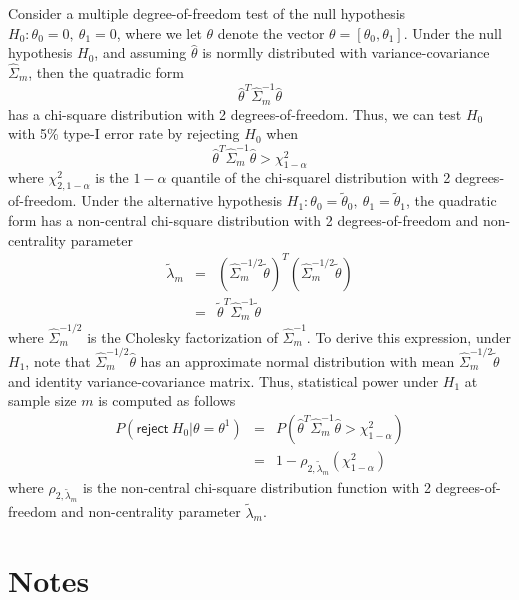 \documentclass{article}
\begin{document}
Consider a multiple degree-of-freedom test of the null hypothesis $H_0: \theta_0 = 0,\ \theta_1 = 0$, where we let $\theta$ denote the vector $\theta = [\theta_0, \theta_1]$. Under the null hypothesis $H_0$, and assuming $\hat{\theta}$ is normlly distributed with variance-covariance $\hat{\Sigma}_m$,  then the quatradic form
$$
\hat{\theta}^T\hat{\Sigma}_m^{-1}\hat{\theta}
$$
 has a chi-square distribution with 2 degrees-of-freedom. Thus, we can test $H_0$ with 5\% type-I error rate by rejecting $H_0$ when 
$$
\hat{\theta}^T\hat{\Sigma}_m^{-1}\hat{\theta} > \chi^2_{1-\alpha}
$$
where $\chi^2_{2,1-\alpha}$ is the $1-\alpha$ quantile of the chi-squarel distribution with 2 degrees-of-freedom. Under the alternative hypothesis $H_1: \theta_0 = \tilde{\theta}_0,\ \theta_1 = \tilde{\theta}_1$, the quadratic form has a non-central chi-square distribution with 2 degrees-of-freedom and non-centrality parameter
\begin{eqnarray}
\tilde{\lambda}_m &=& (\hat{\Sigma}_m^{-1/2}\tilde{\theta})^T(\hat{\Sigma}_m^{-1/2}\tilde{\theta}) \nonumber \\
&=& \tilde{\theta}^T\hat{\Sigma}_m^{-1} \tilde{\theta} \nonumber
\end{eqnarray}
where $\hat{\Sigma}_m^{-1/2}$ is the Cholesky factorization of $\hat{\Sigma}_m^{-1}$. To derive this expression, under $H_1$, note that $\hat{\Sigma}_m^{-1/2}\hat{\theta}$ has an approximate normal distribution with mean $\hat{\Sigma}_m^{-1/2}\tilde{\theta}$ and identity variance-covariance matrix. Thus, statistical power under $H_1$ at sample size $m$ is computed as follows
\begin{eqnarray}
P(\mathsf{reject}\ H_0 | \theta = \theta^1) &=& P\left(\hat{\theta}^T\hat{\Sigma}_m^{-1}\hat{\theta} > \chi^2_{1-\alpha}\right) \nonumber \\
&=& 1-\rho_{2,\tilde{\lambda}_m}\left(\chi^2_{1-\alpha}\right) \nonumber
\end{eqnarray}
where $\rho_{2,\tilde{\lambda}_m}$ is the non-central chi-square distribution function with 2 degrees-of-freedom and non-centrality parameter $\tilde{\lambda}_m$.


\section{Notes}
\end{document}
